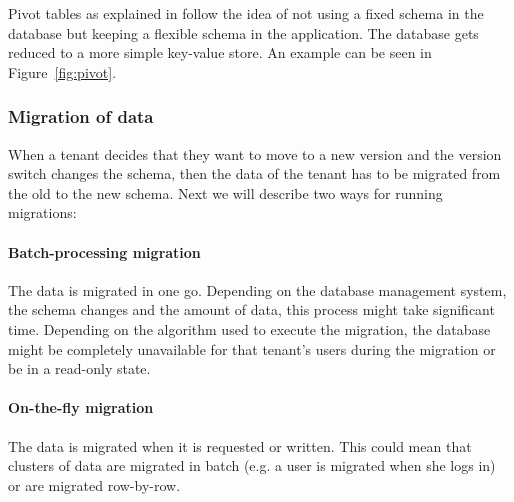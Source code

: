 Pivot tables as explained in \cite{Yaish2011} \cite{Aulbach2011} \cite{Weissman2009} follow the idea of not using a fixed schema in the database but keeping a flexible schema in the application. The database gets reduced to a more simple key-value store. An example can be seen in Figure~\ref{fig:pivot}.

\subsubsection{Migration of data}

When a tenant decides that they want to move to a new version and the version switch changes the schema, then the data of the tenant has to be migrated from the old to the new schema. Next we will describe two ways for running migrations:

\paragraph{Batch-processing migration} The data is migrated in one go. Depending on the database management system, the schema changes and the amount of data, this process might take significant time. Depending on the algorithm used to execute the migration, the database might be completely unavailable for that tenant's users during the migration or be in a read-only state.

\paragraph{On-the-fly migration} The data is migrated when it is requested or written. This could mean that clusters of data are migrated in batch (e.g. a user is migrated when she logs in) or are migrated row-by-row.

